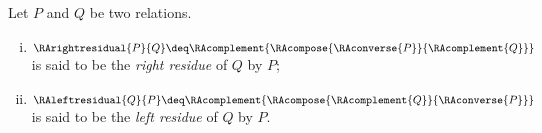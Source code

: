 \begin{definition}
\label{def:residue}
	Let $P$ and $Q$ be two relations. 
	\begin{enumerate}[(i)]
   		\item $\RArightresidual{P}{Q} \deq \RAcomplement{\RAcompose{\RAconverse{P}}{\RAcomplement{Q}}}$ is said to be the \textit{right residue} of $Q$ by $P$;
   		\item $\RAleftresidual{Q}{P}  \deq \RAcomplement{\RAcompose{\RAcomplement{Q}}{\RAconverse{P}}}$ is said to be the \textit{left residue} of $Q$ by $P$.
	\end{enumerate}
\end{definition}